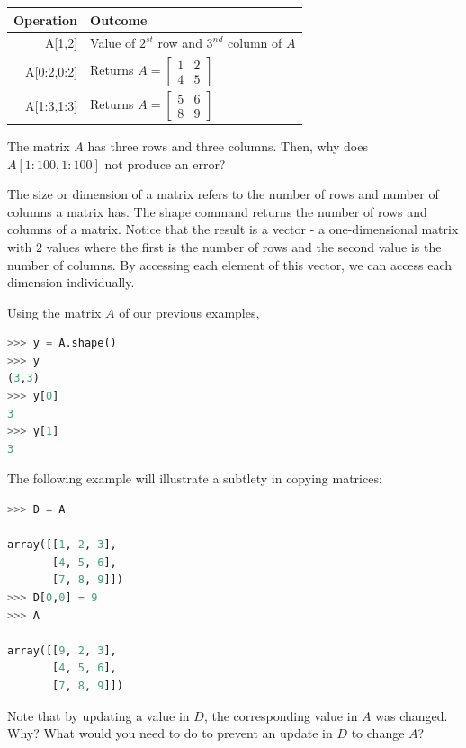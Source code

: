 \begin{tabular}{r|l}
Operation 			& Outcome \\
\hline
{\s A[1,2]} 				&  Value of $2^{st}$ row and $3^{nd}$ column of $A$\\
{\s A[0:2,0:2]} 		&  Returns $A = \begin{bmatrix} 1 & 2 \\ 4 & 5\end{bmatrix} $\\
{\s A[1:3,1:3]} 		&  Returns $A = \begin{bmatrix} 5 & 6 \\ 8 & 9\end{bmatrix} $\\
\hline
\end{tabular}

\vs

The matrix $A$ has three rows and three columns. Then, why does $A[1:100,1:100]$  not produce an error? \QA

The size or dimension of a matrix refers to the number of rows and
number of columns a matrix has. The {\s shape} command returns the number
of rows and columns of a matrix. 
Notice that the result is a vector - a one-dimensional matrix with
2 values where the first is the number of rows and the second value
is the number of columns. By accessing each element of this vector,
we can access each dimension individually. 

Using the matrix $A$ of our previous examples, 

\begin{lstlisting}[language=Python]
>>> y = A.shape()
>>> y
(3,3)
>>> y[0]
3
>>> y[1]
3
\end{lstlisting}

The following example will illustrate a subtlety in copying matrices:

\begin{lstlisting}[language=Python]
>>> D = A

array([[1, 2, 3],
       [4, 5, 6],
       [7, 8, 9]])
>>> D[0,0] = 9
>>> A

array([[9, 2, 3],
       [4, 5, 6],
       [7, 8, 9]])
\end{lstlisting}

Note that by updating a value in $D$, the corresponding value in $A$ was changed. Why? What would you need to do to prevent an update in $D$ to change $A$?  \QA 

